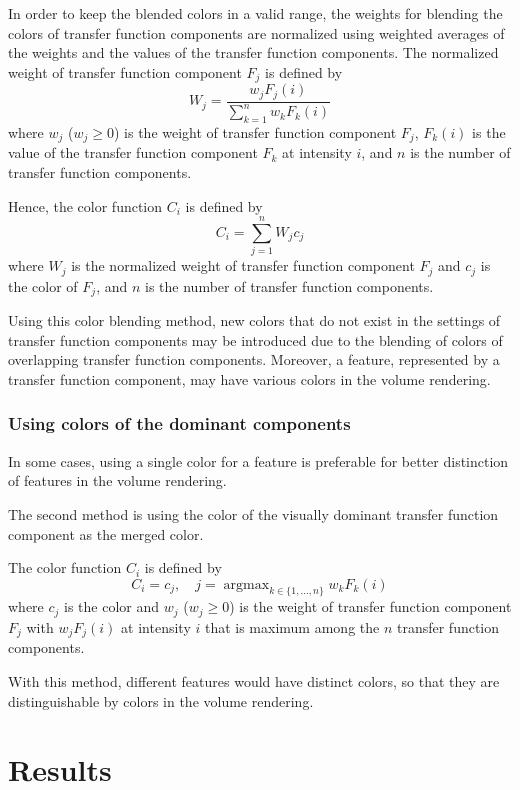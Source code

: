 \documentclass[twoside,twocolumn,10pt]{article}
\DeclareMathOperator*{\argmax}{argmax} %
\begin{document}
In order to keep the blended colors in a valid range, the weights for blending the colors of transfer function components are normalized using weighted averages of the weights and the values of the transfer function components.
The normalized weight of transfer function component $ F_{j} $ is defined by
\[ W_{j}=
\frac{w_{j}F_{j}(i)}{\sum_{k=1}^{n}w_{k}F_{k}(i)}
\]
where $ w_{j} $ ($ w_{j} \geq 0 $) is the weight of transfer function component $ F_{j} $, $ F_{k}(i) $ is the value of the transfer function component $ F_{k} $ at intensity $ i $, and $ n $ is the number of transfer function components.

Hence, the color function $ C_{i} $ is defined by
\[ C_{i}=
\sum_{j=1}^{n} W_{j}c_{j}
\]
where $ W_{j} $ is the normalized weight of transfer function component $ F_{j} $ and $ c_{j} $ is the color of $ F_{j} $, and $ n $ is the number of transfer function components.

Using this color blending method, new colors that do not exist in the settings of transfer function components may be introduced due to the blending of colors of overlapping transfer function components.
Moreover, a feature, represented by a transfer function component, may have various colors in the volume rendering.

\subsubsection{Using colors of the dominant components}
In some cases, using a single color for a feature is preferable for better distinction of features in the volume rendering.

The second method is using the color of the visually dominant transfer function component as the merged color.

The color function $ C_{i} $ is defined by
\[ 
C_{i} = c_{j},\quad j = \argmax_{k \in \{1,...,n\}} w_{k}F_{k}(i)
\]
where $ c_{j} $ is the color and $ w_{j} $ ($ w_{j} \geq 0 $) is the weight of transfer function component $ F_{j} $ with $ w_{j}F_{j}(i) $ at intensity $ i $ that is maximum among the $ n $ transfer function components.

With this method, different features would have distinct colors, so that they are distinguishable by colors in the volume rendering.

\section{Results}
\end{document}
